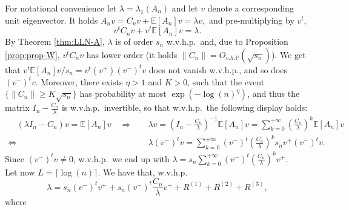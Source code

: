 \documentclass[11pt,oneside]{amsart}
\theoremstyle{plain}
\numberwithin{equation}{section}
\newcommand{\wehp}{{w.v.h.p.~}}
\newcommand{\E}{\mathbb{E}}
\newcommand{\p}{\mathbb{P}}
\newcommand{\centered}{C_n}
\newcommand{\term}{R}
\newcommand{\scaling}{s_n}
\newcommand{\Ohp}{O_{v.h.\p}}
\begin{document}
For notational convenience let $\lambda=\lambda_1(A_n)$ and let $v$ denote a corresponding unit eigenvector.
It holds $ A_nv = \centered v+\E[A_n]v=\lambda v,$
and pre-multiplying by $v^t$,
 $$ v^t \centered v+v^t\E[A_n]v=\lambda.$$
By Theorem \ref{thm:LLN-A}, $\lambda$ is of order $\scaling$ w.v.h.p.\ and, due to Proposition \ref{prop:prop-W}, $v^t \centered v$ has lower order (it holds $\|\centered\|=\Ohp(\sqrt{\scaling})$). We get that $v^t \E[A_n] v /\scaling = v^t (v^+) (v^-)^t v$  does not vanish w.v.h.p., and so does $(v^-)^t v $. 
Moreover, there exists $\eta>1$ and $K>0$, such that the event $\{\|\centered\|\ge K \sqrt{\scaling}\}$  has probability at most $\exp(-\log(n)^\eta)$, and thus the matrix $I_n-\frac{\centered}{\lambda}$ is \wehp invertible, 
so that \wehp the following display holds:
\vspace{0.3cm}
\begin{equation} \label{eq:implications}
\begin{split}
 \quad (\lambda I_n-\centered)v = \E[A_n] v
\quad \Longrightarrow & \quad \lambda v = \left(I_n-\frac{\centered}{\lambda}\right)^{-1}\E[A_n] v
= \sum_{k=0}^{+\infty} \left(\frac{\centered}{\lambda}\right)^k\E[A_n]v \\
\Longleftrightarrow & \quad   \lambda (v^-)^t v = \sum_{k=0}^{+\infty} (v^-)^t\left(\frac{\centered}{\lambda}\right)^k\scaling v^+ (v^-)^tv.
\end{split}
\end{equation}
Since $(v^-)^t v\neq0$, \wehp we end up with
    $\lambda = \scaling\sum_{k=0}^{+\infty} (v^-)^t\left(\frac{\centered}{\lambda}\right)^k v^+.$\\
Let now $L=\lceil\log(n)\rceil$. We have that, \wehp
\begin{equation} \label{eq:lambda-decomp}
    \lambda 
    =\scaling(v^-)^tv^+ +\scaling(v^-)^t \frac{\centered}{\lambda} v^++ \term^{(1)} +\term^{(2)} +\term^{(3)} ,\end{equation}
    where
\end{document}
